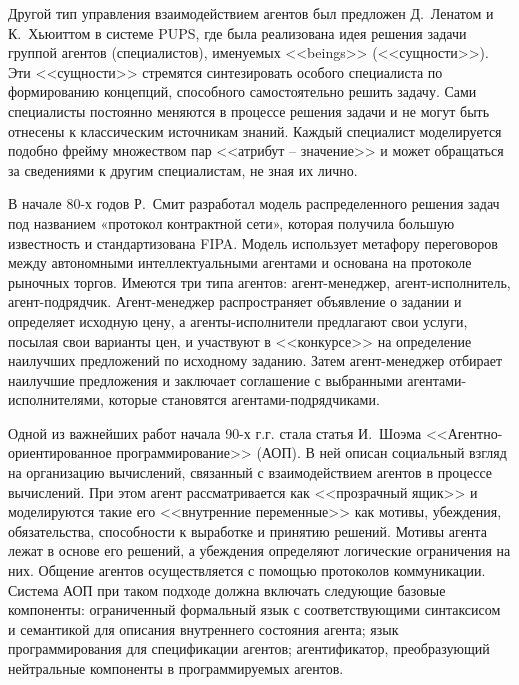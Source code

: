 Другой тип управления взаимодействием агентов был предложен Д.~Ленатом и К.~Хьюиттом в системе PUPS, где была реализована идея решения задачи группой агентов (специалистов), именуемых <<beings>> (<<сущности>>). Эти <<сущности>> стремятся синтезировать особого специалиста по формированию концепций, способного самостоятельно решить задачу. Сами специалисты постоянно меняются в процессе решения задачи и не могут быть отнесены к классическим источникам знаний. Каждый специалист моделируется подобно фрейму множеством пар <<атрибут -- значение>> и может обращаться за сведениями к другим специалистам, не зная их лично.

В начале 80-х годов Р.~Смит разработал модель распределенного решения задач под названием «протокол контрактной сети», которая получила большую известность и стандартизована FIPA. Модель использует метафору переговоров между автономными интеллектуальными агентами и основана на протоколе рыночных торгов. Имеются три типа агентов: агент-менеджер, агент-исполнитель, агент-подрядчик. Агент-менеджер распространяет объявление о задании и определяет исходную цену, а агенты-исполнители предлагают свои услуги, посылая свои варианты цен, и участвуют в <<конкурсе>> на определение наилучших предложений по исходному заданию. Затем агент-менеджер отбирает наилучшие предложения и заключает соглашение с выбранными агентами-исполнителями, которые становятся агентами-подрядчиками.

Одной из важнейших работ начала 90-х г.г. стала статья И.~Шоэма <<Агентно-ориентированное программирование>> (АОП). В ней описан социальный взгляд на организацию вычислений, связанный с взаимодействием агентов в процессе вычислений. При этом агент рассматривается как <<прозрачный ящик>> и моделируются такие его <<внутренние переменные>> как мотивы, убеждения, обязательства, способности к выработке и принятию решений. Мотивы агента лежат в основе его решений, а убеждения определяют логические ограничения на них. Общение агентов осуществляется с помощью протоколов коммуникации.
Система АОП при таком подходе должна включать следующие базовые компоненты: ограниченный формальный язык с соответствующими синтаксисом и семантикой для описания внутреннего состояния агента; язык программирования для спецификации агентов; агентификатор, преобразующий нейтральные компоненты в программируемых агентов.

